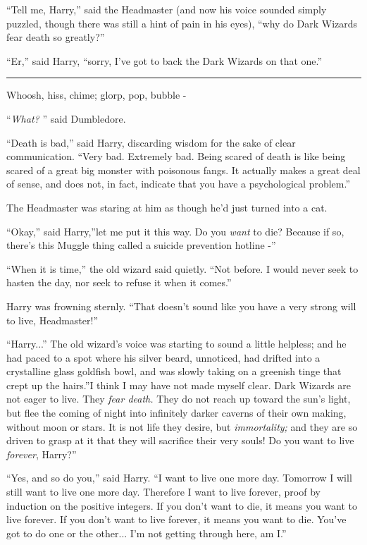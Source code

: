 ``Tell me, Harry,'' said the Headmaster (and now his voice sounded
simply puzzled, though there was still a hint of pain in his eyes),
``why do Dark Wizards fear death so greatly?''

``Er,'' said Harry, ``sorry, I've got to back the Dark Wizards on that
one.''

\begin{center}\rule{3in}{0.4pt}\end{center}

Whoosh, hiss, chime; glorp, pop, bubble -

``\emph{What?} '' said Dumbledore.

``Death is bad,'' said Harry, discarding wisdom for the sake of clear
communication. ``Very bad. Extremely bad. Being scared of death is like
being scared of a great big monster with poisonous fangs. It actually
makes a great deal of sense, and does not, in fact, indicate that you
have a psychological problem.''

The Headmaster was staring at him as though he'd just turned into a cat.

``Okay,'' said Harry,''let me put it this way. Do you \emph{want} to
die? Because if so, there's this Muggle thing called a suicide
prevention hotline -''

``When it is time,'' the old wizard said quietly. ``Not before. I would
never seek to hasten the day, nor seek to refuse it when it comes.''

Harry was frowning sternly. ``That doesn't sound like you have a very
strong will to live, Headmaster!''

``Harry...'' The old wizard's voice was starting to sound a little
helpless; and he had paced to a spot where his silver beard, unnoticed,
had drifted into a crystalline glass goldfish bowl, and was slowly
taking on a greenish tinge that crept up the hairs.''I think I may have
not made myself clear. Dark Wizards are not eager to live. They
\emph{fear death.} They do not reach up toward the sun's light, but flee
the coming of night into infinitely darker caverns of their own making,
without moon or stars. It is not life they desire, but
\emph{immortality;} and they are so driven to grasp at it that they will
sacrifice their very souls! Do you want to live \emph{forever}, Harry?''

``Yes, and so do you,'' said Harry. ``I want to live one more day.
Tomorrow I will still want to live one more day. Therefore I want to
live forever, proof by induction on the positive integers. If you don't
want to die, it means you want to live forever. If you don't want to
live forever, it means you want to die. You've got to do one or the
other... I'm not getting through here, am I.''

